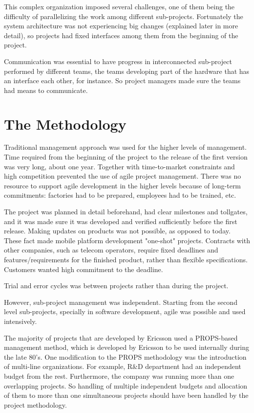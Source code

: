 \documentclass[journal]{IEEEtran}
\begin{document}
This complex organization imposed several challenges, one of them being the difficulty of parallelizing the work among different sub-projects. Fortunately the system architecture was not experiencing big changes (explained later in more detail), so projects had fixed interfaces among them from the beginning of the project.

Communication was essential to have progress in interconnected sub-project performed by different teams, the teams developing part of the hardware that has an interface each other, for instance. So project managers made sure the teams had means to communicate.  

\section{The Methodology}
Traditional management approach was used for the higher levels of management. Time required from the beginning of the project to the release of the first version was very long, about one year. Together with time-to-market constraints and high competition prevented the use of agile project management. There was no resource to support agile development in the higher levels because of long-term commitments: factories had to be prepared, employees had to be trained, etc. 

The project was planned in detail beforehand, had clear milestones and tollgates, and it was made sure it was developed and verified sufficiently before the first release. Making updates on products was not possible, as opposed to today. These fact made mobile platform development "one-shot" projects. Contracts with other companies, such as telecom operators, require fixed deadlines and features/requirements for the finished product, rather than flexible specifications. Customers wanted high commitment to the deadline.

Trial and error cycles was between projects rather than during the project.

However, sub-project management was independent. Starting from the second level sub-projects, specially in software development, agile was possible and used intensively.

The majority of projects that are developed by Ericsson used a PROPS-based management method, which is developed by Ericsson to be used internally during the late 80's. One modification to the PROPS methodology was the introduction of multi-line organizations. For example, R\&D department had an independent budget from the rest. Furthermore, the company was running more than one overlapping projects. So handling of multiple independent budgets and allocation of them to more than one simultaneous projects should have been handled by the project methodology. 
\end{document}
